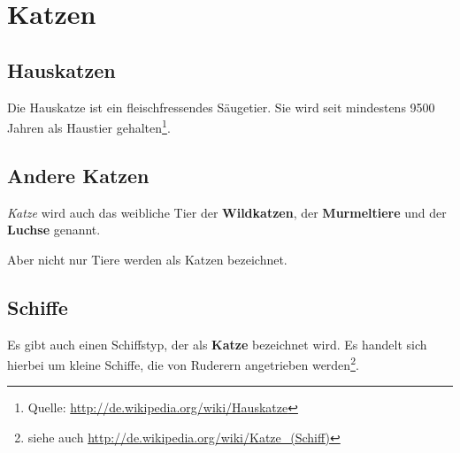 \documentclass[a4paper, pdftex, ngerman, 11pt]{article}
\begin{document}
\section{Katzen}
\subsection{Hauskatzen}
Die Hauskatze ist ein fleischfressendes Säugetier. Sie wird seit mindestens 9500 Jahren als Haustier gehalten\footnote{Quelle: \url{http://de.wikipedia.org/wiki/Hauskatze}}.
\subsection{Andere Katzen}
\textit{Katze} wird auch das weibliche Tier der \textbf{Wildkatzen}, der \textbf{Murmeltiere} und der \textbf{Luchse} genannt.

Aber nicht nur Tiere werden als Katzen bezeichnet.
\subsection{Schiffe}
Es gibt auch einen Schiffstyp, der als \textbf{Katze} bezeichnet wird. Es handelt sich hierbei um \tiny kleine \normalsize Schiffe, die von Ruderern angetrieben werden\footnote{siehe auch \url{http://de.wikipedia.org/wiki/Katze\_(Schiff)}}.
\end{document}
